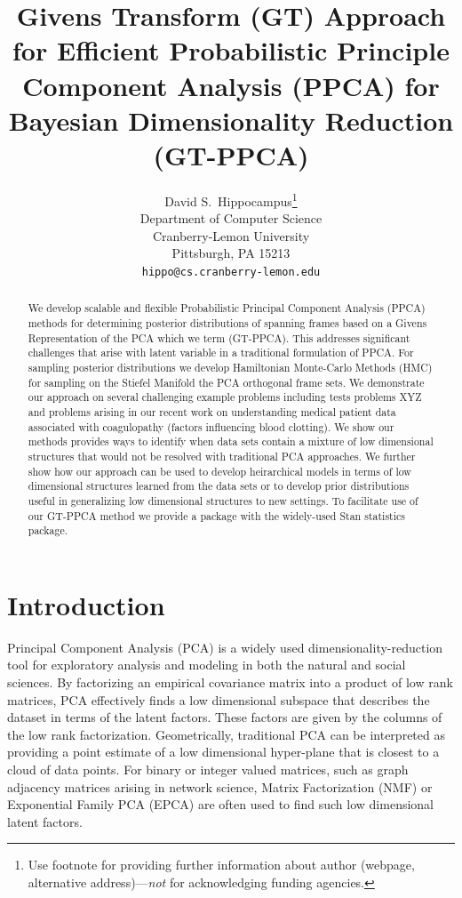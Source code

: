 \documentclass{article}
\title{Givens Transform (GT) Approach for Efficient Probabilistic Principle Component Analysis (PPCA) for Bayesian Dimensionality Reduction (GT-PPCA)}
\author{
  David S.~Hippocampus\thanks{Use footnote for providing further
    information about author (webpage, alternative
    address)---\emph{not} for acknowledging funding agencies.} \\
  Department of Computer Science\\
  Cranberry-Lemon University\\
  Pittsburgh, PA 15213 \\
  \texttt{hippo@cs.cranberry-lemon.edu} \\
}
\newcommand{\commentPJA}[1]{{\textcolor{commentPJA_color}{PJA: #1}}}
\begin{document}

\maketitle

\begin{abstract}
We develop scalable and flexible Probabilistic Principal Component Analysis (PPCA) methods for determining posterior distributions of spanning frames based on a Givens Representation of the PCA which we term (GT-PPCA).  This addresses significant challenges that arise with latent variable in a traditional formulation of PPCA.  For sampling posterior distributions we develop Hamiltonian Monte-Carlo Methods (HMC) for sampling on the Stiefel Manifold the PCA orthogonal frame sets.  We demonstrate our approach on several challenging example problems including tests problems XYZ and problems arising in  our recent work on understanding medical patient data associated with coagulopathy (factors influencing blood clotting).  We show our methods provides ways to identify when data sets contain a mixture of low dimensional structures that would not be resolved with traditional PCA approaches.  We further show how our approach can be used to develop heirarchical models in terms of low dimensional structures learned from the data sets or to develop prior distributions useful in generalizing low dimensional structures to new settings.  To facilitate use of our GT-PPCA method we provide a package with the widely-used Stan statistics package.  
\end{abstract}

\section{Introduction}


Principal Component Analysis (PCA) is a widely used dimensionality-reduction tool for exploratory analysis and modeling in both the natural and social sciences. By factorizing an empirical covariance matrix into a product of low rank matrices, PCA effectively finds a low dimensional subspace that describes the dataset in terms of the latent factors.  These factors are given by the columns of the low rank factorization.  Geometrically, traditional PCA can be interpreted as providing a point estimate of a low dimensional hyper-plane that is closest to a cloud of data points.  For binary or integer valued matrices, such as graph adjacency matrices arising in network science, Matrix Factorization (NMF) \citep{lee2001algorithms} or Exponential Family PCA (EPCA) \citep{collins2001generalization} are often used to find such low dimensional latent factors.
\end{document}
